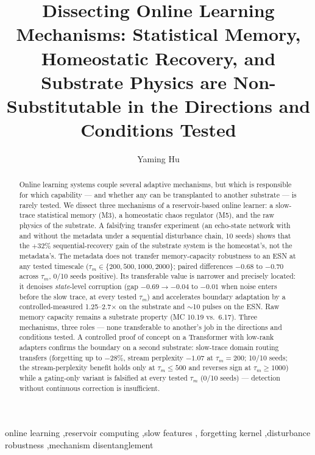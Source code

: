 \documentclass[preprint,12pt]{elsarticle}
\begin{document}
\begin{frontmatter}

\title{Dissecting Online Learning Mechanisms: Statistical Memory,
Homeostatic Recovery, and Substrate Physics are Non-Substitutable
in the Directions and Conditions Tested}

\author{Yaming Hu}

\begin{abstract}
Online learning systems couple several adaptive mechanisms, but which
is responsible for which capability --- and whether any can
be transplanted to another substrate --- is rarely tested. We dissect
three mechanisms of a reservoir-based online learner: a slow-trace
statistical memory (M3), a homeostatic chaos regulator (M5), and the raw
physics of the substrate. A falsifying transfer experiment (an
echo-state network with and without the metadata under a sequential
disturbance chain, 10 seeds) shows that the $+32\%$ sequential-recovery
gain of the substrate system is the homeostat's, not the metadata's. The
metadata does not transfer memory-capacity robustness to an
ESN at any tested timescale ($\tau_m \in \{200,500,1000,2000\}$;
paired differences $-0.68$ to $-0.70$ across $\tau_m$, 0/10 seeds positive). Its
transferable value is narrower and precisely located: it denoises
\emph{state}-level corruption (gap $-0.69 \rightarrow -0.04$ to $-0.01$
when noise enters before the slow trace, at every tested $\tau_m$) and
accelerates boundary adaptation by a controlled-measured 1.25--2.7$\times$
on the substrate and $\sim$10 pulses on the ESN. Raw
memory capacity remains a substrate property (MC 10.19 vs.\ 6.17). Three
mechanisms, three roles --- none transferable to another's job in the
directions and conditions tested.
A controlled proof of concept on a Transformer with low-rank
adapters confirms the boundary on a second substrate: slow-trace domain
routing transfers (forgetting up to $-28\%$, stream perplexity $-1.07$ at
$\tau_m{=}200$; 10/10 seeds; the stream-perplexity benefit holds only at
$\tau_m\le500$ and reverses sign at $\tau_m\ge1000$) while a gating-only variant is falsified at
every tested $\tau_m$ (0/10 seeds) --- detection without continuous
correction is insufficient.
\end{abstract}

\begin{keyword}
online learning \sep reservoir computing \sep slow features \sep
forgetting kernel \sep disturbance robustness \sep mechanism
disentanglement
\end{keyword}

\end{frontmatter}
\end{document}
